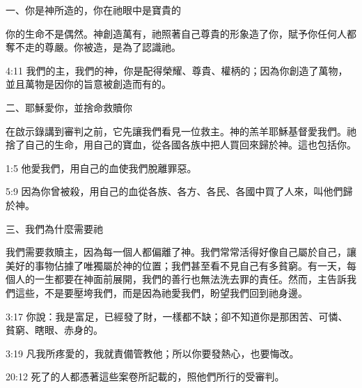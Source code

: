 \clearpage
{}
\begin{center}
\begin{tcolorbox}[
    width=0.95\textwidth,
    colback=white, %
    colframe=gray!70,
    colbacktitle=gray,
    coltitle=white,
    title={\small{\centering 你知道啟示錄中，有許多神要告訴你的福音嗎？}},
    fontupper=\small\setstretch{1.0},
    enhanced,
    boxrule=0.5pt,
    breakable,
    left=0pt,
    right=6pt,
    top=6pt,
    bottom=6pt
]

一、你是神所造的，你在祂眼中是寶貴的

你的生命不是偶然。神創造萬有，祂照著自己尊貴的形象造了你，賦予你任何人都奪不走的尊嚴。你被造，是為了認識祂。
\begin{ScriptureBox}
\item[4:11] 我們的主，我們的神，你是配得榮耀、尊貴、權柄的；因為你創造了萬物，並且萬物是因你的旨意被創造而有的。
\end{ScriptureBox}

\vspace{0.3cm}
二、耶穌愛你，並捨命救贖你

在啟示錄講到審判之前，它先讓我們看見一位救主。神的羔羊耶穌基督愛我們。祂捨了自己的生命，用自己的寶血，從各國各族中把人買回來歸於神。這也包括你。
\begin{ScriptureBox}
\item[1:5] 他愛我們，用自己的血使我們脫離罪惡。
\item[5:9] 因為你曾被殺，用自己的血從各族、各方、各民、各國中買了人來，叫他們歸於神。
\end{ScriptureBox}

\vspace{0.3cm}
三、我們為什麼需要祂

我們需要救贖主，因為每一個人都偏離了神。我們常常活得好像自己屬於自己，讓美好的事物佔據了唯獨屬於神的位置；我們甚至看不見自己有多貧窮。有一天，每個人的一生都要在神面前展開，我們的善行也無法洗去罪的責任。然而，主告訴我們這些，不是要壓垮我們，而是因為祂愛我們，盼望我們回到祂身邊。
\begin{ScriptureBox}
\item[3:17] 你說：我是富足，已經發了財，一樣都不缺；卻不知道你是那困苦、可憐、貧窮、瞎眼、赤身的。
\item[3:19] 凡我所疼愛的，我就責備管教他；所以你要發熱心，也要悔改。
\item[20:12] 死了的人都憑著這些案卷所記載的，照他們所行的受審判。
\end{ScriptureBox}


\end{tcolorbox}
\end{center}
